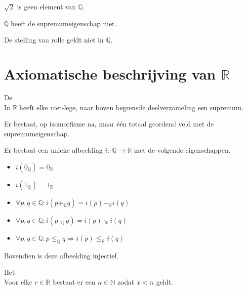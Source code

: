 \documentclass[main.tex]{subfiles}
\begin{document}
\begin{st}
  $\sqrt{2}$ is geen element van $\mathbb{Q}$.
\end{st}

\begin{st}
  $\mathbb{Q}$ heeft de supremumeigenschap niet.
\end{st}

\begin{st}
  De stelling van rolle geldt niet in $\mathbb{Q}$.
\end{st}


\section{Axiomatische beschrijving van $\mathbb{R}$}
\label{sec:axiom-beschr-van}

\begin{st}
  \label{st:supremumeigenschap-R}
  De \\
  In $\mathbb{R}$ heeft elke niet-lege, naar boven begrensde deelverzameling een supremum.
\end{st}

\begin{st}
  Er bestaat, op isomorfisme na, maar \'e\'en totaal geordend veld met de supremumeigenschap.
\end{st}

\begin{pr}
  Er bestaat een unieke afbeelding $i:\ \mathbb{Q} \rightarrow \mathbb{R}$ met de volgende eigenschappen.
  \begin{itemize}
  \item $i(0_{\mathbb{Q}}) = 0_{\mathbb{R}}$
  \item $i(1_{\mathbb{Q}}) = 1_{\mathbb{R}}$
  \item $\forall p,q \in \mathbb{Q}: i(p+_{\mathbb{Q}}q) = i(p) +_{\mathbb{R}} i(q)$
  \item $\forall p,q \in \mathbb{Q}: i(p\cdot_{\mathbb{Q}} q) = i(p) \cdot_{\mathbb{R}} i(q)$
  \item $\forall p,q \in \mathbb{Q}: p \le_{\mathbb{Q}} q \Rightarrow i(p) \le_{\mathbb{R}} i(q)$
  \end{itemize}
  Bovendien is deze afbeelding injectief.
\end{pr}

\begin{lem}
  Het \\
  Voor elke $r\in \mathbb{R}$ bestaat er een $n\in \mathbb{N}$ zodat $x < n$ geldt.
\end{lem}
\end{document}

